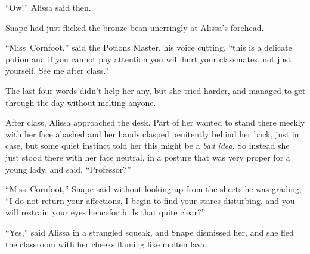 “Ow!” Alissa said then.

Snape had just flicked the bronze bean unerringly at Alissa’s forehead.

“Miss~Cornfoot,” said the Potions Master, his voice cutting, “this is a delicate potion and if you cannot pay attention you will hurt your classmates, not just yourself. See me after class.”

The last four words didn’t help her any, but she tried harder, and managed to get through the day without melting anyone.

After class, Alissa approached the desk. Part of her wanted to stand there meekly with her face abashed and her hands clasped penitently behind her back, just in case, but some quiet instinct told her this might be a \emph{bad idea}. So instead she just stood there with her face neutral, in a posture that was very proper for a young lady, and said, “Professor?”

“Miss~Cornfoot,” Snape said without looking up from the sheets he was grading, “I do not return your affections, I begin to find your stares disturbing, and you will restrain your eyes henceforth. Is that quite clear?”

“Yes,” said Alissa in a strangled squeak, and Snape dismissed her, and she fled the classroom with her cheeks flaming like molten lava.


